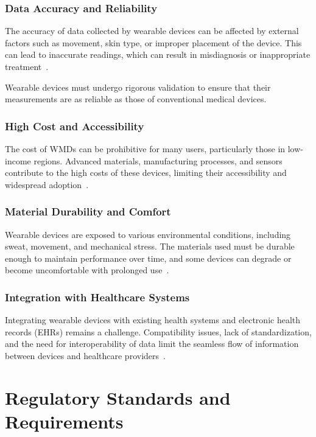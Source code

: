 \documentclass[journal]{IEEEtran}
\begin{document}
        \subsubsection{Data Accuracy and Reliability}

        The accuracy of data collected by wearable devices can be affected by external factors such as movement, skin type, or improper placement of the device. This can lead to inaccurate readings, which can result in misdiagnosis or inappropriate treatment~\cite{Lu2020}.

        Wearable devices must undergo rigorous validation to ensure that their measurements are as reliable as those of conventional medical devices.

        \subsubsection{High Cost and Accessibility}

        The cost of WMDs can be prohibitive for many users, particularly those in low-income regions. Advanced materials, manufacturing processes, and sensors contribute to the high costs of these devices, limiting their accessibility and widespread adoption~\cite{Liu2018}.

        \subsubsection{Material Durability and Comfort}

        Wearable devices are exposed to various environmental conditions, including sweat, movement, and mechanical stress. The materials used must be durable enough to maintain performance over time, and some devices can degrade or become uncomfortable with prolonged use~\cite{Luo2024}.

        \subsubsection{Integration with Healthcare Systems}

        Integrating wearable devices with existing health systems and electronic health records (EHRs) remains a challenge. Compatibility issues, lack of standardization, and the need for interoperability of data limit the seamless flow of information between devices and healthcare providers~\cite{Ravizza2019}.

\section{Regulatory Standards and Requirements}
\label{8.Regulatory}
\end{document}
